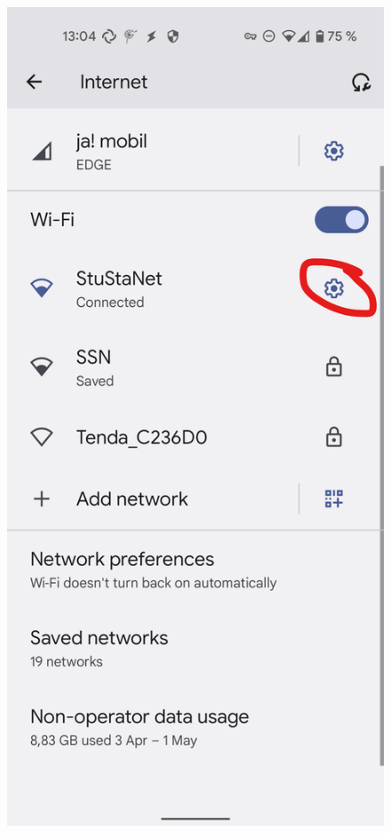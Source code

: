 \documentclass[a4paper,12pt]{scrartcl}
\begin{document}
\begin{figure}[h]
	\centering
	\begin{minipage}{0.20\textwidth}
		\includegraphics[width=0.7\linewidth,keepaspectratio]{Bilder/Android/android12_1}
	\end{minipage}
	\begin{minipage}{0.20\textwidth}

\end{minipage}
\end{figure}
\end{document}
